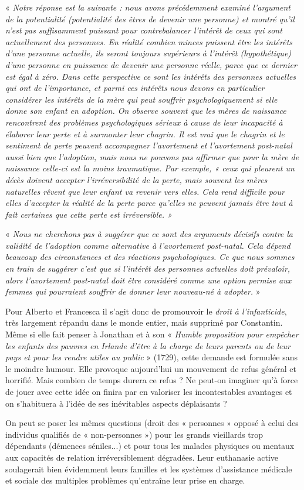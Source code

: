 « \emph{Notre réponse est la suivante : nous avons précédemment examiné l'argument de la potentialité (potentialité des êtres de devenir une personne) et montré qu'il n'est pas suffisamment puissant pour contrebalancer l'intérêt de ceux qui sont actuellement des personnes. En réalité combien minces puissent être les intérêts d'une personne actuelle, ils seront toujours supérieurs à l'intérêt (hypothétique) d'une personne en puissance de devenir une personne réelle, parce que ce dernier est égal à zéro. Dans cette perspective ce sont les intérêts des personnes actuelles qui ont de l'importance, et parmi ces intérêts nous devons en particulier considérer les intérêts de la mère qui peut souffrir psychologiquement si elle donne son enfant en adoption. On observe souvent que les mères de naissance rencontrent des problèmes psychologiques sérieux à cause de leur incapacité à élaborer leur perte et à surmonter leur chagrin. Il est vrai que le chagrin et le sentiment de perte peuvent accompagner l'avortement et l'avortement post-natal aussi bien que l'adoption, mais nous ne pouvons pas affirmer que pour la mère de naissance celle-ci est la moins traumatique. Par exemple, « ceux qui pleurent un décès doivent accepter l'irréversibilité de la perte, mais souvent les mères naturelles rêvent que leur enfant va revenir vers elles. Cela rend difficile pour elles d'accepter la réalité de la perte parce qu'elles ne peuvent jamais être tout à fait certaines que cette perte est irréversible. »}

« \emph{Nous ne cherchons pas à suggérer que ce sont des arguments décisifs contre la validité de l'adoption comme alternative à l'avortement post-natal. Cela dépend beaucoup des circonstances et des réactions psychologiques. Ce que nous sommes en train de suggérer c'est que si l'intérêt des personnes actuelles doit prévaloir, alors l'avortement post-natal doit être considéré comme une option permise aux femmes qui pourraient souffrir de donner leur nouveau-né à adopter.} »

 Pour Alberto  et Francesca   il  s'agit donc de promouvoir le \emph{droit à l'infanticide}, très largement répandu dans le monde entier, mais supprimé par Constantin. Même si elle fait penser à Jonathan  et à son « \emph{Humble proposition pour empêcher les enfants des pauvres en Irlande d'être à la charge de leurs parents ou de leur pays et pour les rendre utiles au public} » (1729), cette demande est formulée sans le moindre humour. Elle provoque aujourd'hui un mouvement de refus général et horrifié. Mais combien de temps durera ce refus ? Ne peut-on imaginer qu'à force de jouer avec cette idée on finira par en valoriser les incontestables avantages et on s'habituera à l'idée de ses inévitables aspects déplaisants ? 
  

 On peut se poser les mêmes questions (droit des « personnes » opposé à celui des individus qualifiés de « non-personnes ») pour les grands vieillards trop dépendants (démences séniles...) et pour tous les malades physiques ou mentaux aux capacités de relation irréversiblement dégradées. Leur euthanasie active soulagerait bien évidemment leurs familles et les systèmes d'assistance médicale et sociale des multiples problèmes qu'entraîne leur prise en charge.
 
 
